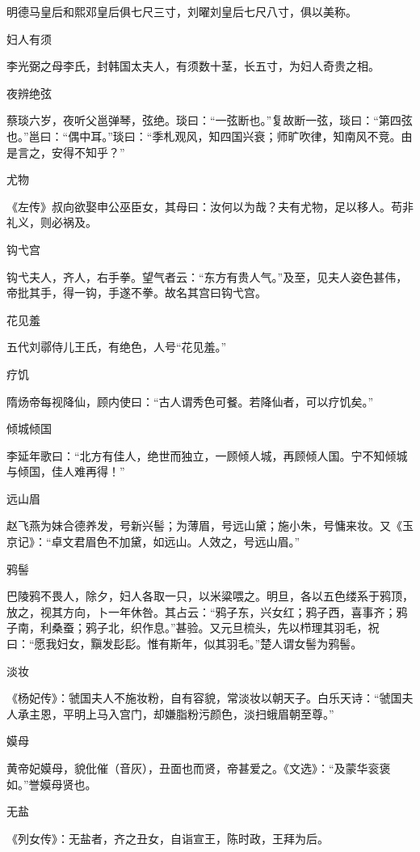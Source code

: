 \documentclass[a4paper,12pt,UTF8,twoside]{ctexbook}
\begin{document}
    明德马皇后和熙邓皇后俱七尺三寸，刘曜刘皇后七尺八寸，俱以美称。
    
    妇人有须
    
    李光弼之母李氏，封韩国太夫人，有须数十茎，长五寸，为妇人奇贵之相。
    
    夜辨绝弦
    
    蔡琰六岁，夜听父邕弹琴，弦绝。琰曰：“一弦断也。”复故断一弦，琰曰：“第四弦也。”邕曰：“偶中耳。”琰曰：“季札观风，知四国兴衰；师旷吹律，知南风不竞。由是言之，安得不知乎？”
    
    尤物
    
    《左传》叔向欲娶申公巫臣女，其母曰：汝何以为哉？夫有尤物，足以移人。苟非礼义，则必祸及。
    
    钩弋宫
    
    钩弋夫人，齐人，右手拳。望气者云：“东方有贵人气。”及至，见夫人姿色甚伟，帝批其手，得一钩，手遂不拳。故名其宫曰钩弋宫。
    
    花见羞
    
    五代刘鄩侍儿王氏，有绝色，人号“花见羞。”
    
    疗饥
    
    隋炀帝每视降仙，顾内使曰：“古人谓秀色可餐。若降仙者，可以疗饥矣。”
    
    倾城倾国
    
    李延年歌曰：“北方有佳人，绝世而独立，一顾倾人城，再顾倾人国。宁不知倾城与倾国，佳人难再得！”
    
    远山眉
    
    赵飞燕为妹合德养发，号新兴髻；为薄眉，号远山黛；施小朱，号慵来妆。又《玉京记》：“卓文君眉色不加黛，如远山。人效之，号远山眉。”
    
    鸦髻
    
    巴陵鸦不畏人，除夕，妇人各取一只，以米粱喂之。明旦，各以五色缕系于鸦顶，放之，视其方向，卜一年休咎。其占云：“鸦子东，兴女红；鸦子西，喜事齐；鸦子南，利桑蚕；鸦子北，织作息。”甚验。又元旦梳头，先以栉理其羽毛，祝曰：“愿我妇女，黰发髟髟。惟有斯年，似其羽毛。”楚人谓女髻为鸦髻。
    
    淡妆
    
    《杨妃传》：虢国夫人不施妆粉，自有容貌，常淡妆以朝天子。白乐天诗：“虢国夫人承主恩，平明上马入宫门，却嫌脂粉污颜色，淡扫蛾眉朝至尊。”
    
    嫫母
    
    黄帝妃嫫母，貌仳催（音灰），丑面也而贤，帝甚爱之。《文选》：“及蒙华衮褒如。”誉嫫母贤也。
    
    无盐
    
    《列女传》：无盐者，齐之丑女，自诣宣王，陈时政，王拜为后。
    
\end{document}
